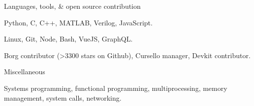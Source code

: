 \begin{cventries}
  \cventry
    {Languages, tools, \& open source contribution}
    {}
    {}
    {}
    {
      \begin{cvitems}
        \item {Python, C, C++, MATLAB, Verilog, JavaScript.}
        \item {Linux, Git, Node, Bash, VueJS, GraphQL.}
        \item {Borg contributor (>3300 stars on Github), Cursello manager, Devkit contributor.}
      \end{cvitems}
    }
  \cventry
    {Miscellaneous}
    {}
    {}
    {}
    {
      \begin{cvitems}
        \item {Systems programming, functional programming, multiprocessing, memory management, system calls, networking.}
      \end{cvitems}
    }
\end{cventries}
